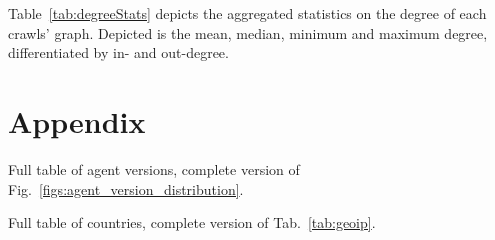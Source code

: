 \documentclass[10pt]{article}
\begin{document}
Table~\ref{tab:degreeStats} depicts the aggregated statistics on the degree of each crawls' graph.
Depicted is the mean, median, minimum and maximum degree, differentiated by in- and out-degree.

%

\section*{Appendix}
\label{sec:appendix}

Full table of agent versions, complete version of Fig.~\ref{figs:agent_version_distribution}.


Full table of countries, complete version of Tab.~\ref{tab:geoip}.

\end{document}
